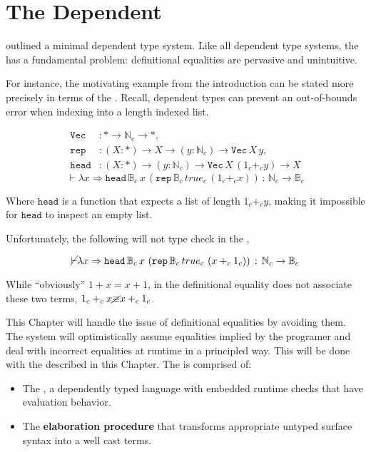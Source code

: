 \chapter{The Dependent \CSys{}}
\label{chapter:Cast}
\thispagestyle{myheadings}
 
 outlined a minimal dependent type system.
Like all dependent type systems, the \slang{} has a fundamental problem: definitional equalities are pervasive and unintuitive.
 
For instance, the motivating example from the introduction can be stated more precisely in terms of the \slang{}.
Recall, dependent types can prevent an out-of-bounds error when indexing into a length indexed list.

\begin{align*}
\mathtt{Vec} & :*\rightarrow\mathbb{N}_{c}\rightarrow*,\\
\mathtt{rep} & :\left(X:*\right)\rightarrow X\rightarrow\left(y:\mathbb{N}_{c}\right)\rightarrow\mathtt{Vec\,}X\,y,\\
\mathtt{head} & :\left(X:*\right)\rightarrow\left(y:\mathbb{N}_{c}\right)\rightarrow\mathtt{Vec}\,X\,\left(1_{c}+_{c}y\right)\rightarrow X
\end{align*}
\[
\vdash\lambda x\Rightarrow\mathtt{head}\,\mathbb{B}_{c}\,x\,\left(\mathtt{rep}\,\mathbb{B}_{c}\,true_{c}\,\left(1_{c}+_{c}x\right)\right)\,:\,\mathbb{N}_{c}\rightarrow\mathbb{B}_{c}
\]

Where $\mathtt{head}$ is a function that expects a list of length $1_{c}+_{c}y$, making it impossible for $\mathtt{head}$ to inspect an empty list.

Unfortunately, the following will not type check in the \slang{},

\[
\cancel{\vdash}\lambda x\Rightarrow\mathtt{head}\,\mathbb{B}_{c}\,x\,\left(\mathtt{rep}\,\mathbb{B}_{c}\,true_{c}\,\left(x+_{c}1_{c}\right)\right)\,:\,\mathbb{N}_{c}\rightarrow\mathbb{B}_{c}
\]

\sloppy While ``obviously'' $1+x=x+1$, in the \slang{} definitional equality does not associate these two terms, $1_{c}+_{c}x\cancel{\equiv}x+_{c}1_{c}$.
 
This Chapter will handle the issue of definitional equalities by avoiding them.
The system will optimistically assume equalities implied by the programer and deal with incorrect equalities at runtime in a principled way.
This will be done with the \textbf{\csys{}} described in this Chapter.
The \csys{} is comprised of:
\begin{itemize}
\item The \textbf{\clang{}}, a dependently typed language with embedded runtime checks that have evaluation behavior.
\item The \textbf{elaboration procedure} that transforms appropriate untyped surface syntax into a well cast terms.
\end{itemize}
 
